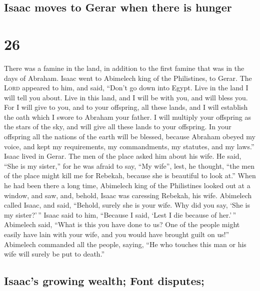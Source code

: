 \hypertarget{isaac-moves-to-gerar-when-there-is-hunger}{%
\subsection{Isaac moves to Gerar when there is
hunger}\label{isaac-moves-to-gerar-when-there-is-hunger}}

\hypertarget{section-25}{%
\section{26}\label{section-25}}

 There was a famine in the land, in addition to the first
famine that was in the days of Abraham. Isaac went to Abimelech king of
the Philistines, to Gerar.  The \textsc{Lord} appeared to
him, and said, ``Don't go down into Egypt. Live in the land I will tell
you about.  Live in this land, and I will be with you, and
will bless you. For I will give to you, and to your offspring, all these
lands, and I will establish the oath which I swore to Abraham your
father.  I will multiply your offspring as the stars of
the sky, and will give all these lands to your offspring. In your
offspring all the nations of the earth will be blessed, 
because Abraham obeyed my voice, and kept my requirements, my
commandments, my statutes, and my laws.''  Isaac lived in
Gerar.  The men of the place asked him about his wife. He
said, ``She is my sister,'' for he was afraid to say, ``My wife'', lest,
he thought, ``the men of the place might kill me for Rebekah, because
she is beautiful to look at.''  When he had been there a
long time, Abimelech king of the Philistines looked out at a window, and
saw, and, behold, Isaac was caressing Rebekah, his wife. 
Abimelech called Isaac, and said, ``Behold, surely she is your wife. Why
did you say, `She is my sister?'\,'' Isaac said to him, ``Because I
said, `Lest I die because of her.'\,''  Abimelech said,
``What is this you have done to us? One of the people might easily have
lain with your wife, and you would have brought guilt on us!''
 Abimelech commanded all the people, saying, ``He who
touches this man or his wife will surely be put to death.''

\hypertarget{isaacs-growing-wealth-font-disputes}{%
\subsection{Isaac's growing wealth; Font
disputes;}\label{isaacs-growing-wealth-font-disputes}}

